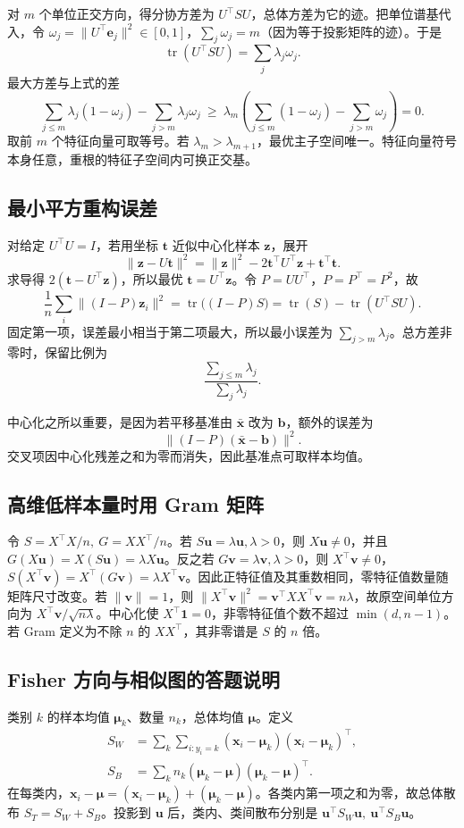 \documentclass[UTF8,a4paper,zihao=-4,fontset=fandol]{ctexrep}
\begin{document}
对 \(m\) 个单位正交方向，得分协方差为 \(U^\top S U\)，总体方差为它的迹。把单位谱基代入，令 \(\omega_j=\|U^\top\bm e_j\|^2\in[0,1]\)，\(\sum_j\omega_j=m\)（因为等于投影矩阵的迹）。于是
\[
 \operatorname{tr}(U^\top S U)=\sum_j\lambda_j\omega_j .
\]
最大方差与上式的差
\[
 \sum_{j\le m}\lambda_j(1-\omega_j)-\sum_{j>m}\lambda_j\omega_j
 \ \ge\ \lambda_m\left(\sum_{j\le m}(1-\omega_j)-\sum_{j>m}\omega_j\right)=0 .
\]
取前 \(m\) 个特征向量可取等号。若 \(\lambda_m>\lambda_{m+1}\)，最优主子空间唯一。特征向量符号本身任意，重根的特征子空间内可换正交基。

\subsection*{最小平方重构误差}
对给定 \(U^\top U=I\)，若用坐标 \(\bm t\) 近似中心化样本 \(\bm z\)，展开
\[
 \|\bm z-U\bm t\|^2=\|\bm z\|^2-2\bm t^\top U^\top\bm z+\bm t^\top\bm t .
\]
求导得 \(2(\bm t-U^\top\bm z)\)，所以最优 \(\bm t=U^\top\bm z\)。令 \(P=UU^\top\)，\(P=P^\top=P^2\)，故
\[
 \frac1n\sum_i\|(I-P)\bm z_i\|^2
 =\operatorname{tr}\big((I-P)S\big)
 =\operatorname{tr}(S)-\operatorname{tr}(U^\top S U).
\]
固定第一项，误差最小相当于第二项最大，所以最小误差为 \(\sum_{j>m}\lambda_j\)。总方差非零时，保留比例为
\[
\frac{\sum_{j\le m}\lambda_j}{\sum_j\lambda_j}.
\]

中心化之所以重要，是因为若平移基准由 \(\bar{\bm x}\) 改为 \(\bm b\)，额外的误差为
\[
\|(I-P)(\bar{\bm x}-\bm b)\|^2 .
\]
交叉项因中心化残差之和为零而消失，因此基准点可取样本均值。

\subsection*{高维低样本量时用 Gram 矩阵}
令 \(S=X^\top X/n,\ G=XX^\top/n\)。若 \(S\bm u=\lambda\bm u,\lambda>0\)，则 \(X\bm u\ne0\)，并且 \(G(X\bm u)=X(S\bm u)=\lambda X\bm u\)。反之若 \(G\bm v=\lambda\bm v,\lambda>0\)，则 \(X^\top\bm v\ne0\)，\(S(X^\top\bm v)=X^\top(G\bm v)=\lambda X^\top\bm v\)。因此正特征值及其重数相同，零特征值数量随矩阵尺寸改变。若 \(\|\bm v\|=1\)，则 \(\|X^\top\bm v\|^2=\bm v^\top XX^\top\bm v=n\lambda\)，故原空间单位方向为 \(X^\top\bm v/\sqrt{n\lambda}\)。中心化使 \(X^\top\bm 1=0\)，非零特征值个数不超过 \(\min(d,n-1)\)。若 Gram 定义为不除 \(n\) 的 \(XX^\top\)，其非零谱是 \(S\) 的 \(n\) 倍。

\subsection*{Fisher 方向与相似图的答题说明}
类别 \(k\) 的样本均值 \(\bm\mu_k\)、数量 \(n_k\)，总体均值 \(\bm\mu\)。定义
\[
 \begin{aligned}
 S_W&=\sum_k\sum_{i:y_i=k}(\bm x_i-\bm\mu_k)(\bm x_i-\bm\mu_k)^\top,\\
 S_B&=\sum_k n_k(\bm\mu_k-\bm\mu)(\bm\mu_k-\bm\mu)^\top.
 \end{aligned}
\]
在每类内，\(\bm x_i-\bm\mu=(\bm x_i-\bm\mu_k)+(\bm\mu_k-\bm\mu)\)。各类内第一项之和为零，故总体散布 \(S_T=S_W+S_B\)。投影到 \(\bm u\) 后，类内、类间散布分别是 \(\bm u^\top S_W\bm u,\ \bm u^\top S_B\bm u\)。
 
\end{document}
